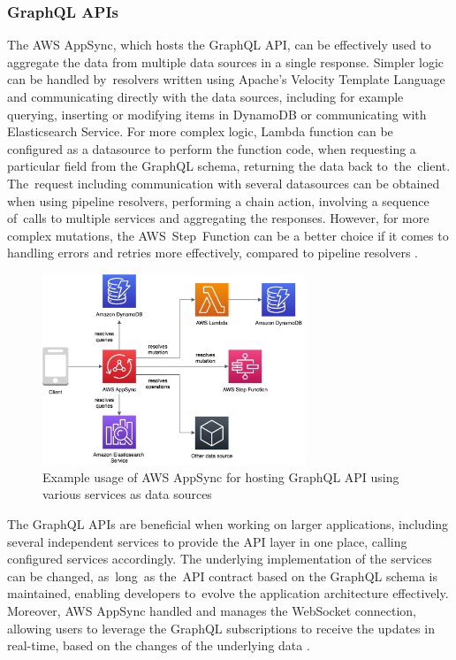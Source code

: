 \subsubsection{GraphQL APIs} \label{chapter:client-graphql-apis}

The AWS AppSync, which hosts the GraphQL API, can be effectively used to aggregate the data from multiple data sources in a single response.
Simpler logic can be handled by~resolvers written using Apache’s Velocity Template Language and communicating directly with the data sources, including for example querying, inserting or modifying items in DynamoDB or communicating with Elasticsearch Service.
For more complex logic, Lambda function can be configured as a datasource to perform the function code, when requesting a particular field from the GraphQL schema, returning the data back to~the~client.
The~request including communication with several datasources can be obtained when using pipeline resolvers, performing a chain action, involving a sequence of~calls to multiple services and aggregating the responses.
However, for more complex mutations, the AWS~Step~Function can be a better choice if it comes to handling errors and retries more effectively, compared to pipeline resolvers \cite{ServerlessArchitecturalPatternsAndBestPractices}.

\begin{figure}[h]
   \centering
   \includegraphics[width=0.7\textwidth]{assets/04-serverless-for-web-apps/graphql.png}
   \caption{Example usage of AWS AppSync for hosting GraphQL API using various services as data sources}
   \label{fig:pattern-graphql-api}
\end{figure}

The GraphQL APIs are beneficial when working on larger applications, including several independent services to provide the API layer in one place, calling configured services accordingly.
The underlying implementation of the services can be changed, as~long~as the~API contract based on the GraphQL schema is maintained, enabling developers to~evolve the application architecture effectively.
Moreover, AWS AppSync handled and manages the WebSocket connection, allowing users to leverage the GraphQL subscriptions to receive the updates in real-time, based on the changes of the underlying data \cite{DevelopServerlessGraphQLArchitecturesUsingAWSAppSync}.

